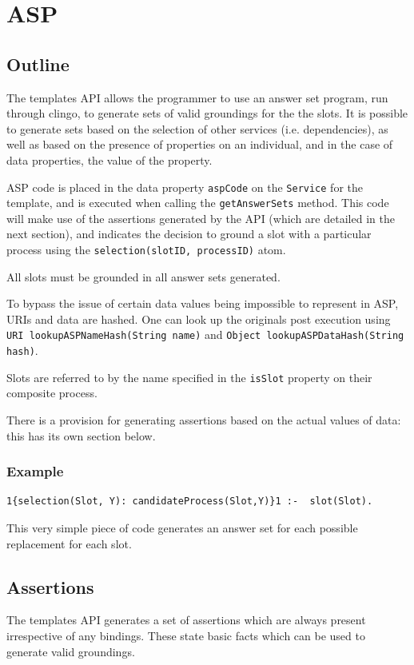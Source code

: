 \documentclass{llncs}
\begin{document}
\section{ASP}
\subsection{Outline}
 The templates API allows the programmer to use an answer set program, run through 
 clingo, to generate sets of valid groundings for the the slots. It is possible to 
 generate sets based on the selection of other services (i.e. dependencies), as well 
 as based on the presence of properties on an individual, and in the case of data 
 properties, the value of the property.

 ASP code is placed in the data property \texttt{aspCode} on the \texttt{Service} 
 for the template, and is executed when calling the \texttt{getAnswerSets} method. 
 This code will make use of the assertions generated by the API (which are detailed 
 in the next section), and indicates the decision to ground a slot with a particular 
 process using the \texttt{selection(slotID, processID)} atom.

 All slots must be grounded in all answer sets generated.

 To bypass the issue of certain data values being impossible to represent in ASP, 
 URIs and data are hashed. One can look up the originals post execution using 
 \texttt{URI lookupASPNameHash(String name)} and \texttt{Object lookupASPDataHash(String hash)}.
 
 Slots are referred to by the name specified in the \texttt{isSlot} property on their 
 composite process.

 There is a provision for generating assertions based on the actual values of data: this 
 has its own section below.

 \subsubsection{Example}
 \begin{verbatim}
1{selection(Slot, Y): candidateProcess(Slot,Y)}1 :-  slot(Slot).\end{verbatim}
This very simple piece of code generates an answer set for each possible 
replacement for each slot.

\subsection{Assertions}
 The templates API generates a set of assertions which are always present 
 irrespective of any bindings. These state basic facts which can be used 
 to generate valid groundings.
\end{document}
